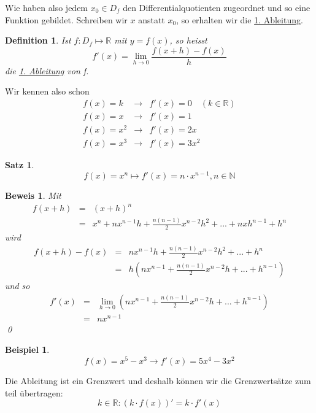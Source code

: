 \documentclass{report}
\newtheorem{mydef}{Definition}
\newtheorem{myexample}{Beispiel}
\newtheorem{myproof}{Beweis}
\newtheorem{satz}{Satz}
\begin{document}
Wie haben also jedem $x_0 \in D_f$ den Differentialquotienten zugeordnet und so eine Funktion gebildet. Schreiben wir $x$ anstatt $x_0$, so erhalten wir die \underline{1. Ableitung}.
\begin{mydef} Ist $f: D_f \mapsto \mathbb{R}$ mit $y = f(x)$, so heisst \begin{equation}f'(x) = \lim_{h \to 0} \frac{f(x+h) -f(x)}{h}\end{equation}
die \underline{1. Ableitung} von f.\end{mydef}
Wir kennen also schon
\begin{eqnarray}
f(x) = k & \to & f'(x) = 0 \quad  (k \in \mathbb{R}) \\
f(x) = x & \to & f'(x) = 1 \\
f(x) = x^2 & \to & f'(x) = 2x \\
f(x) = x^3 & \to & f'(x) = 3x^2 \end{eqnarray}
\begin{satz}\begin{equation}f(x) = x^n \mapsto f'(x) = n \cdot x^{n-1}, n \in \mathbb{N}\end{equation}\end{satz}
\begin{myproof}Mit \begin{eqnarray}f(x+h) & = & (x+h)^n \nonumber \\
& = & x^n + nx^{n-1}h + \frac{n(n-1)}{2}x^{n-2}h^2+ ... + nxh^{n-1} + h^n\end{eqnarray}
wird
\begin{eqnarray}f(x+h)-f(x) & = & nx^{n-1}h + \frac{n(n-1)}{2}x^{n-2}h^2+ ... + h^n \nonumber \\
& = & h(nx^{n-1}+\frac{n(n-1)}{2}x^{n-2}h + ... + h^{n-1})\end{eqnarray}
und so
\begin{eqnarray}f'(x) & = & \lim_{h \to 0}(nx^{n-1} + \frac{n(n-1)}{2}x^{n-2}h + ... + h^{n-1}) \nonumber \\
& = & nx^{n-1}\end{eqnarray} \qed
\end{myproof}
\begin{myexample}
\begin{equation}f(x) = x^5-x^3 \to f'(x) = 5x^4-3x^2\end{equation}
\end{myexample}
Die Ableitung ist ein Grenzwert und deshalb können wir die Grenzwertsätze zum teil übertragen:
\begin{equation}k \in \mathbb{R}: (k \cdot f(x))' = k \cdot f'(x)\end{equation}
\end{document}
